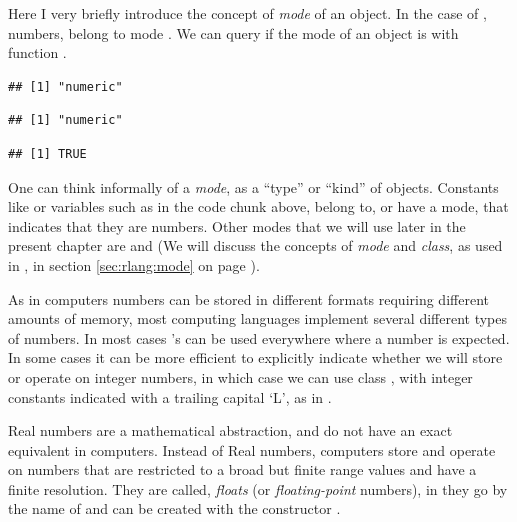 \documentclass[krantz2]{krantz}\usepackage{knitr}%
\begin{document}
\begin{explainbox}
Here I very briefly introduce the concept of \emph{mode} of an \Rlang object. In the case of \Rlang, numbers, belong to mode . We can query if the mode of an object is  with function .

\begin{knitrout}\footnotesize
{}\color{fgcolor}\begin{kframe}
\begin{alltt}
\hlstd{(}\hlstd{)}
\end{alltt}
\begin{verbatim}
## [1] "numeric"
\end{verbatim}
\begin{alltt}
 \hlkwb{<-} 
\end{alltt}
\begin{verbatim}
## [1] "numeric"
\end{verbatim}
\begin{alltt}
\end{alltt}
\begin{verbatim}
## [1] TRUE
\end{verbatim}
\end{kframe}
\end{knitrout}

One can think informally of a \emph{mode}, as a ``type'' or ``kind'' of objects. Constants like  or variables such as  in the code chunk above, belong to, or have a mode, that indicates that they are numbers. Other modes that we will use later in the present chapter are  and  (We will discuss the concepts of \emph{mode} and \emph{class}, as used in \Rlang, in section \ref{sec:rlang:mode} on page \pageref{sec:rlang:mode}).

As in computers numbers can be stored in different formats requiring different amounts of memory, most computing languages implement several different types of numbers. In most cases \Rpgrm's  can be used everywhere where a number is expected. In some cases it can be more efficient to explicitly indicate whether we will store or operate on integer numbers, in which case we can use class , with integer constants indicated with a trailing capital `L', as in  .

Real numbers are a mathematical abstraction, and do not have an exact equivalent in computers. Instead of Real numbers, computers store and operate on numbers that are restricted to a broad but finite range values and have a finite resolution. They are called, \emph{floats} (or \emph{floating-point} numbers), in \Rlang they go by the name of  and can be created with the constructor .


\end{explainbox}
\end{document}
